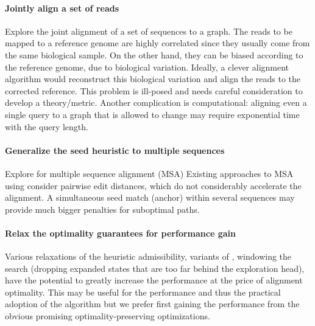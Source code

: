 \paragraph{Jointly align a set of reads}
Explore the joint alignment of a set of sequences to a graph. The reads to be
mapped to a reference genome are highly correlated since they usually come from
the same biological sample. On the other hand, they can be biased according to
the reference genome, due to biological variation. Ideally, a clever alignment
algorithm would reconstruct this biological variation and align the reads to the
corrected reference. This problem is ill-posed and needs careful consideration
to develop a theory/metric. Another complication is computational: aligning even
a single query to a graph that is allowed to change may require exponential time
with the query length.

\paragraph{Generalize the seed heuristic to multiple sequences}
Explore \A for multiple sequence alignment (MSA) Existing approaches to MSA
using \A consider pairwise edit distances, which do not considerably accelerate
the alignment. A simultaneous seed match (anchor) within several sequences may
provide much bigger penalties for suboptimal paths.

\paragraph{Relax the \A optimality guarantees for performance gain}
Various relaxations of the heuristic admissibility, variants of \A, windowing
the search (dropping expanded states that are too far behind the exploration
head), have the potential to greatly increase the performance at the price of
alignment optimality. This may be useful for the performance and thus the
practical adoption of the algorithm but we prefer first gaining the performance
from the obvious promising optimality-preserving optimizations.

%

